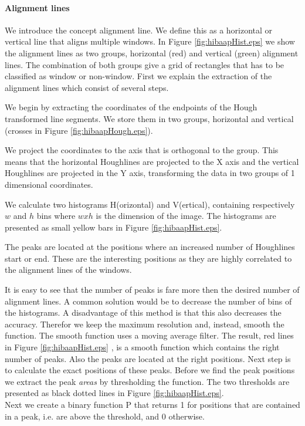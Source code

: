 \paragraph{Alignment lines}
We introduce the concept alignment line. We define this as a horizontal or
vertical line that aligns multiple windows. In Figure
\ref{fig:hibaapHist.eps}
we show the alignment lines as two groups, horizontal (red) and
vertical (green) alignment lines.  The combination of both groups give a grid of
rectangles that has to be classified as window or non-window.
First we explain the extraction of the alignment lines which consist of several
steps.

We begin by extracting the coordinates of the endpoints of the Hough transformed line
segments. We store them in two groups, horizontal and vertical (crosses in Figure
\ref{fig:hibaapHough.eps}). 


We project the coordinates to the axis that is orthogonal to the group. This means
that the horizontal Houghlines are projected to the X axis and the vertical
Houghlines are projected in the Y axis, transforming the data in two groups of 1
dimensional coordinates.

We calculate two histograms H(orizontal) and V(ertical), containing respectively
$w$ and $h$ bins where $w x h$ is the dimension of the image.  The histograms
are presented as small yellow bars in Figure \ref{fig:hibaapHist.eps}.

The peaks are located at the positions where an increased number of Houghlines
start or end.  These are the interesting positions as they are highly correlated
to the alignment lines of the windows. 

It is easy to see that the number of peaks is fare more then the desired number of alignment lines.
A common solution would be to decrease the number of bins of the histograms. A
disadvantage of this method is that this also decreases the accuracy. Therefor
we keep the maximum resolution and, instead, smooth the function. The smooth
function uses a moving average filter.
The result, red lines in Figure \ref{fig:hibaapHist.eps}
, is a smooth function which contains the right number of peaks. Also the peaks
are located at the right positions. Next step is to calculate the exact positions of these peaks.
Before we find the peak positions we extract the peak \emph{areas} by thresholding the
function. The two thresholds are presented as black dotted lines in Figure \ref{fig:hibaapHist.eps}.\\
Next we create a binary function P that returns 1 for positions that are contained in
a peak, i.e. are above the threshold, and 0 otherwise.

